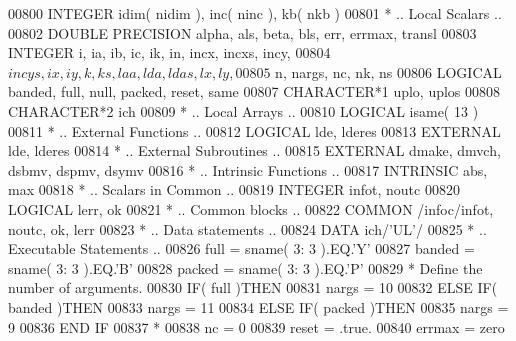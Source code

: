 \begin{DoxyCode}
00800       \textcolor{keywordtype}{INTEGER}            idim( nidim ), inc( ninc ), kb( nkb )
00801 \textcolor{comment}{*     .. Local Scalars ..}
00802       \textcolor{keywordtype}{DOUBLE PRECISION}   alpha, als, beta, bls, err, errmax, transl
00803       \textcolor{keywordtype}{INTEGER}            i, ia, ib, ic, ik, in, incx, incxs, incy,
00804      $                   incys, ix, iy, k, ks, laa, lda, ldas, lx, ly,
00805      $                   n, nargs, nc, nk, ns
00806       \textcolor{keywordtype}{LOGICAL}            banded, full, null, packed, reset, same
00807       \textcolor{keywordtype}{CHARACTER*1}        uplo, uplos
00808       \textcolor{keywordtype}{CHARACTER*2}        ich
00809 \textcolor{comment}{*     .. Local Arrays ..}
00810       \textcolor{keywordtype}{LOGICAL}            isame( 13 )
00811 \textcolor{comment}{*     .. External Functions ..}
00812       \textcolor{keywordtype}{LOGICAL}            lde, lderes
00813       \textcolor{keywordtype}{EXTERNAL}           lde, lderes
00814 \textcolor{comment}{*     .. External Subroutines ..}
00815       \textcolor{keywordtype}{EXTERNAL}           dmake, dmvch, dsbmv, dspmv, dsymv
00816 \textcolor{comment}{*     .. Intrinsic Functions ..}
00817       \textcolor{keywordtype}{INTRINSIC}          abs, max
00818 \textcolor{comment}{*     .. Scalars in Common ..}
00819       \textcolor{keywordtype}{INTEGER}            infot, noutc
00820       \textcolor{keywordtype}{LOGICAL}            lerr, ok
00821 \textcolor{comment}{*     .. Common blocks ..}
00822       \textcolor{keyword}{COMMON}             /infoc/infot, noutc, ok, lerr
00823 \textcolor{comment}{*     .. Data statements ..}
00824       \textcolor{keyword}{DATA}               ich/\textcolor{stringliteral}{'UL'}/
00825 \textcolor{comment}{*     .. Executable Statements ..}
00826       full = sname( 3: 3 ).EQ.\textcolor{stringliteral}{'Y'}
00827       banded = sname( 3: 3 ).EQ.\textcolor{stringliteral}{'B'}
00828       packed = sname( 3: 3 ).EQ.\textcolor{stringliteral}{'P'}
00829 \textcolor{comment}{*     Define the number of arguments.}
00830       \textcolor{keywordflow}{IF}( full )\textcolor{keywordflow}{THEN}
00831          nargs = 10
00832       \textcolor{keywordflow}{ELSE} \textcolor{keywordflow}{IF}( banded )\textcolor{keywordflow}{THEN}
00833          nargs = 11
00834       \textcolor{keywordflow}{ELSE} \textcolor{keywordflow}{IF}( packed )\textcolor{keywordflow}{THEN}
00835          nargs = 9
00836 \textcolor{keywordflow}{      END IF}
00837 \textcolor{comment}{*}
00838       nc = 0
00839       reset = .true.
00840       errmax = zero

\end{DoxyCode}
